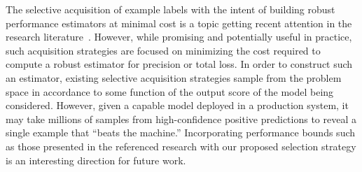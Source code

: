The selective acquisition of example labels with the intent of building robust performance estimators at minimal cost is a topic getting recent attention in the research literature~\cite{activerisk2010,bennett:online}. However, while promising and potentially useful in practice, such acquisition strategies are focused on minimizing the cost required to compute a robust estimator for precision or total loss. In order to construct such an estimator, existing selective acquisition strategies sample from the problem space in accordance to some function of the output score of the model being considered. However, given a capable model deployed in a production system, it may take millions of samples from high-confidence positive predictions to reveal a single example that ``beats the machine.'' Incorporating performance bounds such as those presented in the referenced research with our proposed selection strategy is an interesting direction for future work. 